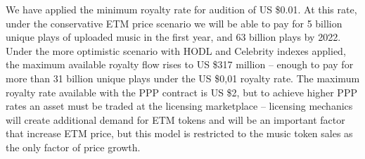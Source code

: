 \documentclass[12pt]{report}
\begin{document}
We have applied the minimum royalty rate for audition of US \$0.01. At this rate, under the conservative ETM price scenario we will be able to pay for 5 billion unique plays of uploaded music in the first year, and 63 billion plays by 2022. Under the more optimistic scenario with HODL and Celebrity indexes applied, the maximum available royalty flow rises to US \$317 million – enough to pay for more than 31 billion unique plays under the US \$0,01 royalty rate. The maximum royalty rate available with the PPP contract is US \$2, but to achieve higher PPP rates an asset must be traded at the licensing marketplace – licensing mechanics will create additional demand for ETM tokens and will be an important factor that increase ETM price, but this model is restricted to the music token sales as the only factor of price growth.
\end{document}
